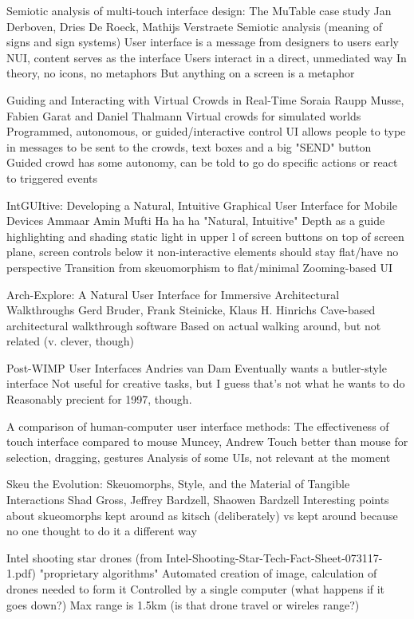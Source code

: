 Semiotic analysis of multi-touch interface design: The MuTable case study
Jan Derboven, Dries De Roeck, Mathijs Verstraete
	Semiotic analysis (meaning of signs and sign systems)
	User interface is a message from designers to users
	early NUI, content serves as the interface
	Users interact in a direct, unmediated way
		In theory, no icons, no metaphors
			But anything on a screen is a metaphor
			
Guiding and Interacting with Virtual Crowds in Real-Time
Soraia Raupp Musse, Fabien Garat and Daniel Thalmann
	Virtual crowds for simulated worlds
	Programmed, autonomous, or guided/interactive control
	UI allows people to type in messages to be sent to the crowds, text boxes and a big "SEND" button
	Guided crowd has some autonomy, can be told to go do specific actions or react to triggered events

IntGUItive: Developing a Natural, Intuitive Graphical User Interface for Mobile Devices
Ammaar Amin Mufti
	Ha ha ha "Natural, Intuitive"
	Depth as a guide
		highlighting and shading
		static light in upper l of screen
		buttons on top of screen plane, screen controls below it
		non-interactive elements should stay flat/have no perspective
	Transition from skeuomorphism to flat/minimal
	Zooming-based UI


Arch-Explore: A Natural User Interface for Immersive Architectural Walkthroughs
Gerd Bruder, Frank Steinicke, Klaus H. Hinrichs
	Cave-based architectural walkthrough software
	Based on actual walking around, but not related (v. clever, though)

Post-WIMP User Interfaces
Andries van Dam
	Eventually wants a butler-style interface
		Not useful for creative tasks, but I guess that's not what he wants to do
	Reasonably precient for 1997, though. 

A comparison of human-computer user interface methods: The effectiveness of touch interface compared to mouse
Muncey, Andrew
	Touch better than mouse for selection, dragging, gestures
	Analysis of some UIs, not relevant at the moment

Skeu the Evolution: Skeuomorphs, Style, and the Material of Tangible Interactions
Shad Gross, Jeffrey Bardzell, Shaowen Bardzell
	Interesting points about skueomorphs kept around as kitsch (deliberately) vs kept around because no one thought to do it a different way

Intel shooting star drones (from Intel-Shooting-Star-Tech-Fact-Sheet-073117-1.pdf)
	"proprietary algorithms"
	Automated creation of image, calculation of drones needed to form it
	Controlled by a single computer (what happens if it goes down?)
	Max range is 1.5km (is that drone travel or wireles range?)


